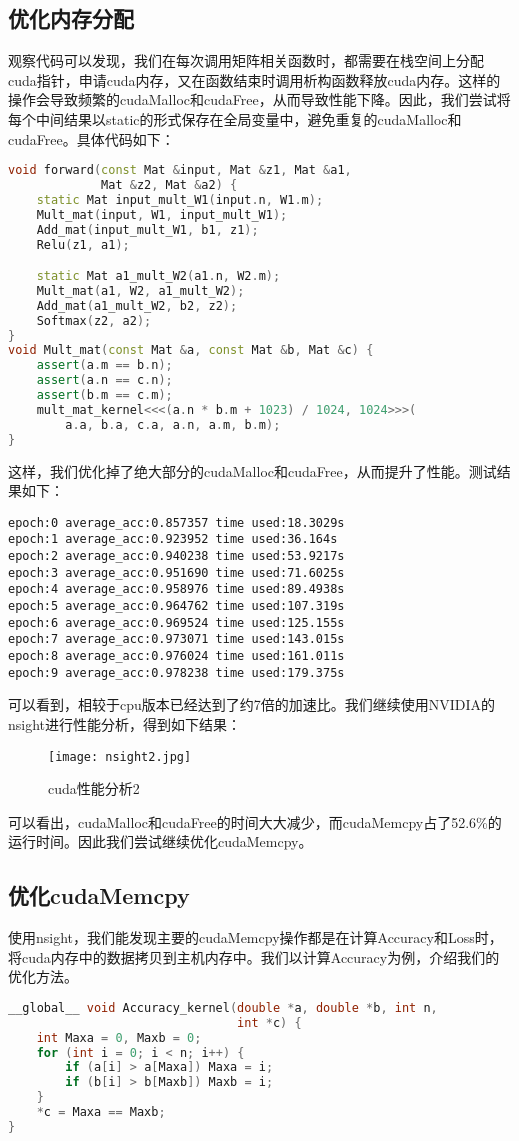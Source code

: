 \documentclass{ctexart}
\begin{document}
\begin{sloppypar}
\subsection{优化内存分配}
观察代码可以发现，我们在每次调用矩阵相关函数时，都需要在栈空间上分配cuda指针，申请cuda内存，又在函数结束时调用析构函数释放cuda内存。这样的操作会导致频繁的cudaMalloc和cudaFree，从而导致性能下降。因此，我们尝试将每个中间结果以static的形式保存在全局变量中，避免重复的cudaMalloc和cudaFree。具体代码如下：
\begin{lstlisting}[language=C++]
void forward(const Mat &input, Mat &z1, Mat &a1,
             Mat &z2, Mat &a2) {
    static Mat input_mult_W1(input.n, W1.m);
    Mult_mat(input, W1, input_mult_W1);
    Add_mat(input_mult_W1, b1, z1);
    Relu(z1, a1);

    static Mat a1_mult_W2(a1.n, W2.m);
    Mult_mat(a1, W2, a1_mult_W2);
    Add_mat(a1_mult_W2, b2, z2);
    Softmax(z2, a2);
}
void Mult_mat(const Mat &a, const Mat &b, Mat &c) {
    assert(a.m == b.n);
    assert(a.n == c.n);
    assert(b.m == c.m);
    mult_mat_kernel<<<(a.n * b.m + 1023) / 1024, 1024>>>(
        a.a, b.a, c.a, a.n, a.m, b.m);
}
\end{lstlisting}
这样，我们优化掉了绝大部分的cudaMalloc和cudaFree，从而提升了性能。测试结果如下：
\begin{lstlisting}
epoch:0 average_acc:0.857357 time used:18.3029s
epoch:1 average_acc:0.923952 time used:36.164s
epoch:2 average_acc:0.940238 time used:53.9217s
epoch:3 average_acc:0.951690 time used:71.6025s
epoch:4 average_acc:0.958976 time used:89.4938s
epoch:5 average_acc:0.964762 time used:107.319s
epoch:6 average_acc:0.969524 time used:125.155s
epoch:7 average_acc:0.973071 time used:143.015s
epoch:8 average_acc:0.976024 time used:161.011s
epoch:9 average_acc:0.978238 time used:179.375s
\end{lstlisting}
可以看到，相较于cpu版本已经达到了约7倍的加速比。我们继续使用NVIDIA的nsight进行性能分析，得到如下结果：
\begin{figure}[H]
    \centering
    \texttt{[image: nsight2.jpg]}
    \caption{cuda性能分析2}
\end{figure}
可以看出，cudaMalloc和cudaFree的时间大大减少，而cudaMemcpy占了52.6\%的运行时间。因此我们尝试继续优化cudaMemcpy。
\subsection{优化cudaMemcpy}
使用nsight，我们能发现主要的cudaMemcpy操作都是在计算Accuracy和Loss时，将cuda内存中的数据拷贝到主机内存中。我们以计算Accuracy为例，介绍我们的优化方法。
\begin{lstlisting}[language=C++]
__global__ void Accuracy_kernel(double *a, double *b, int n,
                                int *c) {
    int Maxa = 0, Maxb = 0;
    for (int i = 0; i < n; i++) {
        if (a[i] > a[Maxa]) Maxa = i;
        if (b[i] > b[Maxb]) Maxb = i;
    }
    *c = Maxa == Maxb;
}


\end{lstlisting}
\end{sloppypar}
\end{document}
